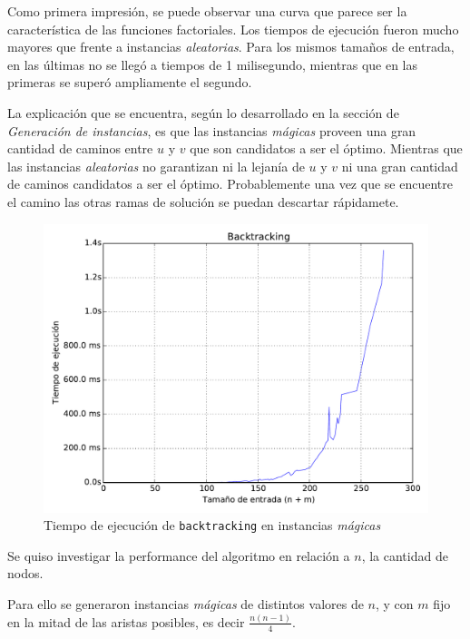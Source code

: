 Como primera impresión, se puede observar una curva que parece ser la característica de las funciones factoriales. Los tiempos de ejecución fueron mucho mayores que frente a instancias \textit{aleatorias}. Para los mismos tamaños de entrada, en las últimas no se llegó a tiempos de 1 milisegundo, mientras que en las primeras se superó ampliamente el segundo.

La explicación que se encuentra, según lo desarrollado en la sección de \textit{Generación de instancias}, es que las instancias \textit{mágicas} proveen una gran cantidad de caminos entre $u$ y $v$ que son candidatos a ser el óptimo. Mientras que las instancias \textit{aleatorias} no garantizan ni la lejanía de $u$ y $v$ ni una gran cantidad de caminos candidatos a ser el óptimo. Probablemente una vez que se encuentre el camino las otras ramas de solución se puedan descartar rápidamete.

\begin{figure}[H]
    \begin{center}
        \includegraphics[width=\textwidth]{imagenes/backtracking-complejidad-general.pdf}
        \caption{Tiempo de ejecución de \texttt{backtracking} en instancias \textit{mágicas}}
    \end{center}
\end{figure}

\newpage
Se quiso investigar la performance del algoritmo en relación a $n$, la cantidad de nodos.

Para ello se generaron instancias \textit{mágicas} de distintos valores de $n$, y con $m$ fijo en la mitad de las aristas posibles, es decir $\frac{n(n-1)}{4}$.

